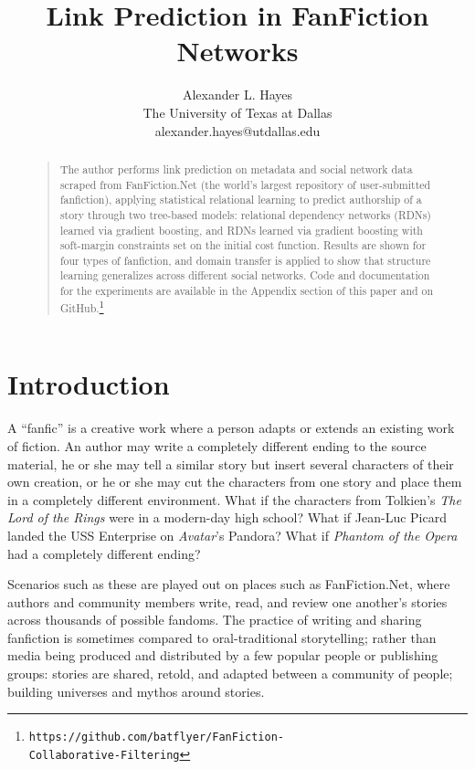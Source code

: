 \documentclass[letterpaper]{article}
\begin{document}
%

\title{Link Prediction in FanFiction Networks}
\author{Alexander L. Hayes\\
The University of Texas at Dallas\\
alexander.hayes@utdallas.edu\\
}

\maketitle
\begin{abstract}
\begin{quote}
The author performs link prediction on metadata and social network data scraped from FanFiction.Net (the world's largest repository of user-submitted fanfiction), applying statistical relational learning to predict authorship of a story through two tree-based models: relational dependency networks (RDNs) learned via gradient boosting, and RDNs learned via gradient boosting with soft-margin constraints set on the initial cost function. Results are shown for four types of fanfiction, and domain transfer is applied to show that structure learning generalizes across different social networks. Code and documentation for the experiments are available in the Appendix section of this paper and on GitHub.\footnote{\texttt{https://github.com/batflyer/FanFiction-\\Collaborative-Filtering}}
\end{quote}
\end{abstract}

\section{Introduction}
A ``fanfic'' is a creative work where a person adapts or extends an existing work of fiction.  An author may write a completely different ending to the source material, he or she may tell a similar story but insert several characters of their own creation, or he or she may cut the characters from one story and place them in a completely different environment.  What if the characters from Tolkien's \textit{The Lord of the Rings} were in a modern-day high school?  What if Jean-Luc Picard landed the USS Enterprise on \textit{Avatar}'s Pandora?  What if \textit{Phantom of the Opera} had a completely different ending?

Scenarios such as these are played out on places such as FanFiction.Net, where authors and community members write, read, and review one another's stories across thousands of possible fandoms.  The practice of writing and sharing fanfiction is sometimes compared to oral-traditional storytelling; rather than media being produced and distributed by a few popular people or publishing groups: stories are shared, retold, and adapted between a community of people; building universes and mythos around stories.
\end{document}
